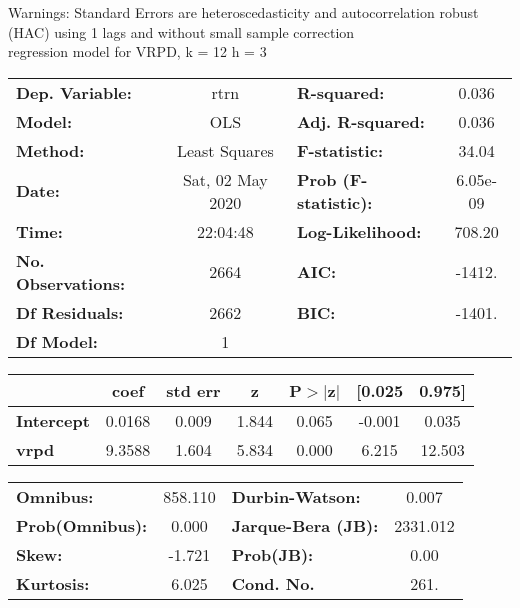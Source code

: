 Warnings: \newline
 [1] Standard Errors are heteroscedasticity and autocorrelation robust (HAC) using 1 lags and without small sample correction\\ 

regression model for VRPD, k = 12 h = 3\begin{center}
\begin{tabular}{lclc}
\toprule
\textbf{Dep. Variable:}    &       rtrn       & \textbf{  R-squared:         } &     0.036   \\
\textbf{Model:}            &       OLS        & \textbf{  Adj. R-squared:    } &     0.036   \\
\textbf{Method:}           &  Least Squares   & \textbf{  F-statistic:       } &     34.04   \\
\textbf{Date:}             & Sat, 02 May 2020 & \textbf{  Prob (F-statistic):} &  6.05e-09   \\
\textbf{Time:}             &     22:04:48     & \textbf{  Log-Likelihood:    } &    708.20   \\
\textbf{No. Observations:} &        2664      & \textbf{  AIC:               } &    -1412.   \\
\textbf{Df Residuals:}     &        2662      & \textbf{  BIC:               } &    -1401.   \\
\textbf{Df Model:}         &           1      & \textbf{                     } &             \\
\bottomrule
\end{tabular}
\begin{tabular}{lcccccc}
                   & \textbf{coef} & \textbf{std err} & \textbf{z} & \textbf{P$> |$z$|$} & \textbf{[0.025} & \textbf{0.975]}  \\
\midrule
\textbf{Intercept} &       0.0168  &        0.009     &     1.844  &         0.065        &       -0.001    &        0.035     \\
\textbf{vrpd}      &       9.3588  &        1.604     &     5.834  &         0.000        &        6.215    &       12.503     \\
\bottomrule
\end{tabular}
\begin{tabular}{lclc}
\textbf{Omnibus:}       & 858.110 & \textbf{  Durbin-Watson:     } &    0.007  \\
\textbf{Prob(Omnibus):} &   0.000 & \textbf{  Jarque-Bera (JB):  } & 2331.012  \\
\textbf{Skew:}          &  -1.721 & \textbf{  Prob(JB):          } &     0.00  \\
\textbf{Kurtosis:}      &   6.025 & \textbf{  Cond. No.          } &     261.  \\
\bottomrule
\end{tabular}
\end{center}

